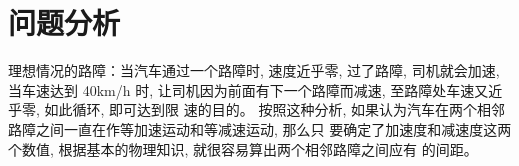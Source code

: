 \section{问题分析}
理想情况的路障：当汽车通过一个路障时, 速度近乎零, 过了路障, 司机就会加速, 当车速达到
40km/h 时, 让司机因为前面有下一个路障而减速, 至路障处车速又近乎零, 如此循环, 即可达到限
速的目的。
按照这种分析, 如果认为汽车在两个相邻路障之间一直在作等加速运动和等减速运动, 那么只
要确定了加速度和减速度这两个数值, 根据基本的物理知识, 就很容易算出两个相邻路障之间应有
的间距。
